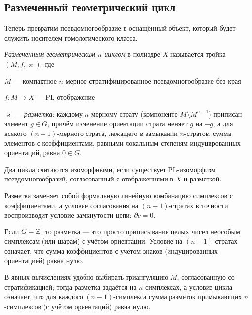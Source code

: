 \documentclass[12pt, twoside]{article}
\begin{document}
\subsection{Размеченный геометрический цикл}

Теперь превратим псевдомногообразие в оснащённый объект, который будет служить носителем гомологического класса.

\begin{definition}\label{def:geomcycle}
\emph{Размеченным геометрическим $n$-циклом} в полиэдре $X$ называется тройка $(M, f, \varkappa)$, где
\begin{inumerate}
\item $M$ --- компактное $n$-мерное стратифицированное псевдомногообразие без края
\item $f : M \to X$ --- PL-отображение
\item $\varkappa$ --- \emph{разметка}: каждому $n$-мерному страту (компоненте $M \setminus M^{n-1}$) приписан элемент $g \in G$, причём изменение ориентации страта меняет $g$ на $-g$, а для всякого $(n-1)$-мерного страта, лежащего в замыкании $n$-стратов, сумма элементов с коэффициентами, равными локальным степеням индуцированных ориентаций, равна $0 \in G$.
\end{inumerate}
Два цикла считаются изоморфными, если существует PL-изоморфизм псевдомногообразий, согласованный с отображениями в $X$ и разметкой.
\end{definition}

Разметка заменяет собой формальную линейную комбинацию симплексов с коэффициентами, а условие согласования на $(n-1)$-стратах в точности воспроизводит условие замкнутости цепи: $\partial c = 0$.

\begin{remark}
Если $G=\mathbb Z$, то разметка --- это просто приписывание целых чисел неособым симплексам (или шарам) с учётом ориентации. Условие на $(n-1)$-стратах означает, что сумма коэффициентов с учётом знаков (индуцированных ориентацией) равна нулю.\footnotemark
\end{remark}
В явных вычислениях удобно выбирать триангуляцию $M$, согласованную со стратификацией; тогда разметка задаётся на $n$-симплексах, а условие цикла означает, что для каждого $(n-1)$-симплекса сумма разметок примыкающих $n$-сим\-плек\-сов (с учётом ориентаций) равна нулю.
\end{document}
